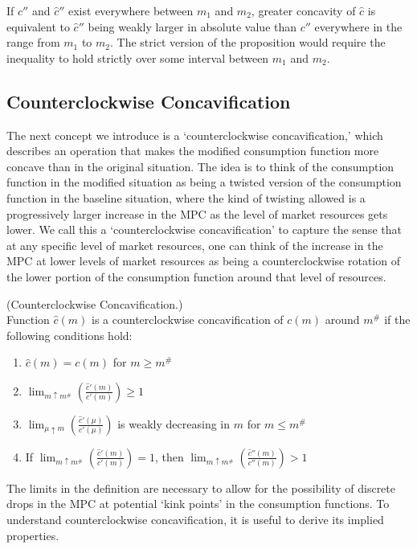   \noindent If $c''$ and $\hat{c}''$ exist everywhere between ${m}_1$ and ${m}_2$, greater concavity of $\hat{c}$ is equivalent to $\hat{c}''$ being weakly larger in absolute value than $c''$ everywhere in the range from ${m}_1$ to ${m}_2$. The strict version of the proposition would require the inequality to hold strictly over some interval between ${m}_1$ and ${m}_2$.

  \subsection{Counterclockwise Concavification}\label{sec:CountC}
  The next concept we introduce is a `counterclockwise concavification,' which describes an operation that makes the modified consumption function more concave than in the original situation. The idea is to think of the consumption function in the modified situation as being a twisted version of the consumption function in the baseline situation, where the kind of twisting allowed is a progressively larger increase in the MPC as the level of market resources gets lower. We call this a `counterclockwise concavification' to capture the sense that at any specific level of market resources, one can think of the increase in the MPC at lower levels of market resources as being a counterclockwise rotation of the lower portion of the consumption function around that level of resources.

  \begin{defn}\label{defn:cconcavification}(Counterclockwise Concavification.) \\
    Function $\hat{c}({m})$ is a counterclockwise concavification of $c({m})$ around ${m}^{\#}$ if the following conditions hold:
    \begin{enumerate}
    \item $\hat{c}({m}) = c({m})$ for ${m} \geq {m}^{\#}$
    \item $\lim_{{m} \uparrow {m}^{\#}} \left(\frac{\hat{c}'({m})}{c'({m})}\right)  \geq 1$
    \item $\lim_{\mu \uparrow {m}} \left(\frac{\hat{c}'(\mu)}{c'(\mu)}\right)$ is weakly decreasing in ${m}$ for ${m} \leq {m}^{\#}$
    \item If $\lim_{{m} \uparrow {m}^{\#}} \left(\frac{\hat{c}'({m})}{c'({m})}\right)  = 1$, then $\lim_{{m} \uparrow {m}^{\#}} \left(\frac{\hat{c}''({m})}{c''({m})}\right) > 1$
    \end{enumerate}
  \end{defn}
  \noindent The limits in the definition are necessary to allow for the possibility of discrete drops in the MPC at potential `kink points' in the consumption functions. To understand counterclockwise concavification, it is useful to derive its implied properties.


